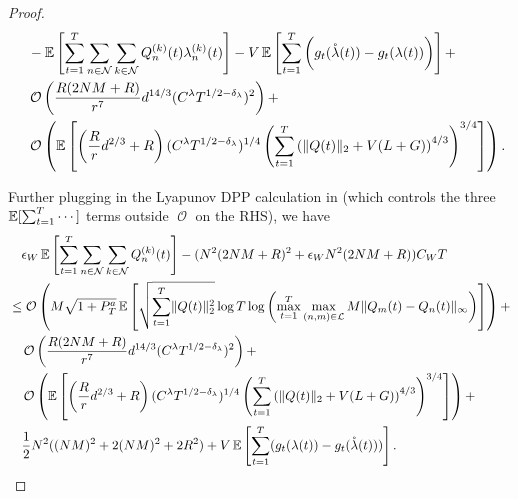 \documentclass[11pt,fullpage,letterpaper]{article} %
\renewcommand{\bm}[1]{#1}%
\renewcommand{\O}{\operatorname{\mathcal O}}
\newcommand{\E}{\operatornamewithlimits{\mathbb{E}}}
\newcommand{\mN}{{\mathcal N}}
\newcommand{\mL}{{\mathcal L}}
\begin{document}
\begin{proof}
\begin{align*}
&\quad - \E\left [\sum_{t=1}^T \sum_{n\in \mN} \sum_{k\in \mN} Q_n^{(k)}(t) \lambda_n^{(k)}(t)\right ] - V \E\left [\sum_{t=1}^T \bigg (g_t(\mathring{\bm \lambda}(t))-g_t(\bm \lambda(t))\bigg )\right ]+\\
&\quad \O\left (\frac{R(2NM+R)}{r^7} d^{14/3} (C^\lambda T^{1/2-\delta_\lambda})^2\right )+\\
&\quad \O\left (\E\left [\left (\frac{R}{r} d^{2/3}+R\right ) (C^\lambda T^{1/2 - \delta_\lambda})^{1/4} \left (\sum_{t=1}^T \left (\lVert \bm Q(t)\rVert_2 + V(L+G)\right )^{4/3}\right )^{3/4}\right ]\right ).
\end{align*}

Further plugging in the Lyapunov DPP calculation in  (which controls the three $\E[\sum_{t=1}^T \cdots]$ terms outside $\O$ on the RHS), we have
\begin{align*}
&\quad \epsilon_W \E\left [\sum_{t=1}^T \sum_{n\in \mN} \sum_{k\in \mN} Q_n^{(k)}(t)\right ] - (N^2 (2NM+R)^2 + \epsilon_W N^2 (2NM+R)) C_W T \nonumber\\
&\le \O\left (M \sqrt{1+P_T^a} \E\left [\sqrt{\sum_{t=1}^T \lVert \bm Q(t)\rVert_2^2} \log T \log \left (\max_{t=1}^T \max_{(n,m)\in \mL} M \lVert \bm Q_m(t) - \bm Q_n(t)\rVert_\infty\right )\right ]\right )+\\
&\quad \O\left (\frac{R(2NM+R)}{r^7} d^{14/3} (C^\lambda T^{1/2-\delta_\lambda})^2\right )+\\
&\quad \O\left (\E\left [\left (\frac{R}{r} d^{2/3}+R\right ) (C^\lambda T^{1/2 - \delta_\lambda})^{1/4} \left (\sum_{t=1}^T \left (\lVert \bm Q(t)\rVert_2 + V(L+G)\right )^{4/3}\right )^{3/4}\right ]\right )+\\
&\quad \frac 12 N^2 ((NM)^2+2(NM)^2+2R^2)+V  \E\left [\sum_{t=1}^T (g_t(\bm \lambda(t))-g_t(\mathring{\bm \lambda}(t)))\right ].
\end{align*}


\end{proof}
\end{document}
